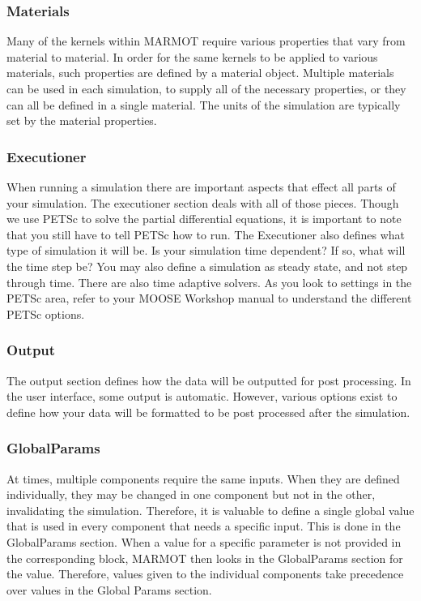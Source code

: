 \documentclass[letter,12pt,fleqn]{article}
\begin{document}
\subsubsection{Materials}

Many of the kernels within MARMOT require various properties that vary from material to material. In order for the same kernels to be applied to various materials, such properties are defined by a material object. Multiple materials can be used in each simulation, to supply all of the necessary properties, or they can all be defined in a single material. The units of the simulation are typically set by the material properties.

\subsubsection{Executioner}

When running a simulation there are important aspects that effect all parts of your simulation. The executioner section deals with all of those pieces. Though we use PETSc to solve the partial differential equations, it is important to note that you still have to tell PETSc how to run. The Executioner also defines what type of simulation it will be. Is your simulation time dependent? If so, what will the time step be? You may also define a simulation as steady state, and not step through time. There are also time adaptive solvers. As you look to settings in the PETSc area, refer to your MOOSE Workshop manual to understand the different PETSc options. 

\subsubsection{Output}

The output section defines how the data will be outputted for post processing. In the user interface, some output is automatic. However, various options exist to define how your data will be formatted to be post processed after the simulation. 

\subsubsection{GlobalParams}

At times, multiple components require the same inputs. When they are defined individually, they may be changed in one component but not in the other, invalidating the simulation. Therefore, it is valuable to define a single global value that is used in every component that needs a specific input. This is done in the GlobalParams section. When a value for a specific parameter is not provided in the corresponding block, MARMOT then looks in the GlobalParams section for the value. Therefore, values given to the individual components take precedence over values in the Global Params section.
\end{document}
